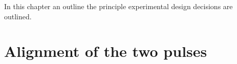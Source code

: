 In this chapter an outline the principle experimental design decisions are outlined.



%







\section{Alignment of the two pulses}


